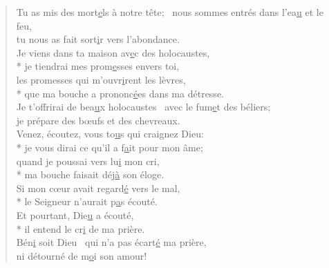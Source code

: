 \begin{verse}
Tu as mis des mort\underline{e}ls à notre tête;~\psalmdagger
nous sommes entrés dans l’ea\underline{u} et le feu, \\
tu nous as fait sort\underline{i}r vers l’abondance. \\

Je viens dans ta maison av\underline{e}c des holocaustes, \\*
je tiendrai mes prom\underline{e}sses envers toi, \\
les promesses qui m’ouvr\underline{i}rent les lèvres, \\*
que ma bouche a prononc\underline{é}es dans ma détresse. \\

Je t’offrirai de bea\underline{u}x holocaustes~\psalmdagger
avec le fum\underline{e}t des béliers; \\
je prépare des bœufs et des chevreaux. \\

Venez, écoutez, vous to\underline{u}s qui craignez Dieu: \\*
je vous dirai ce qu’il a f\underline{a}it pour mon âme; \\
quand je poussai vers lu\underline{i} mon cri, \\*
ma bouche faisait déj\underline{à} son éloge. \\

Si mon cœur avait regard\underline{é} vers le mal, \\*
le Seigneur n’aurait p\underline{a}s écouté. \\
Et pourtant, Die\underline{u} a écouté, \\*
il entend le cr\underline{i} de ma prière. \\

Bén\underline{i} soit Dieu~\psalmdagger
qui n’a pas écart\underline{é} ma prière, \\
ni détourné de m\underline{o}i son amour! \\
\end{verse}


